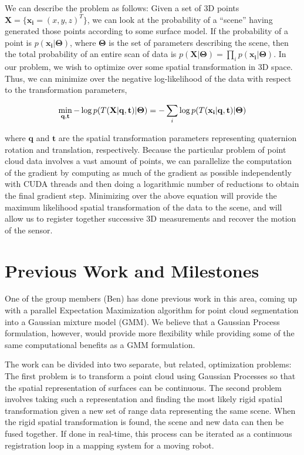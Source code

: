 \documentclass{article} %
\begin{document}
We can describe the problem as follows: Given a set of 3D points $\mathbf{X} = \{\mathbf{x_i} = (x,y,z)^{T}\}$, we can look at the probability of a ``scene'' having generated those points according to some surface model. If the probability of a point is $p(\mathbf{x_i}|\mathbf{\Theta{}})$, where $\mathbf{\Theta{}}$ is the set of parameters describing the scene, then the total probability of an entire scan of data is $p(\mathbf{X}|\mathbf{\Theta{}}) = \prod_{i} p(\mathbf{x_i}|\mathbf{\Theta{}})$. In our problem, we wish to optimize over some spatial transformation in 3D space. Thus, we can minimize over the negative log-likelihood of the data with respect to the transformation parameters,

$$
\min_{\mathbf{q},\mathbf{t}} -\log p(T(\mathbf{X}|\mathbf{q},\mathbf{t})|\mathbf{\Theta{}}) = - \sum_i \log  p(T(\mathbf{x_i}|\mathbf{q},\mathbf{t}) | \mathbf{\Theta{}}) \\
$$

where $\mathbf{q}$ and $\mathbf{t}$ are the spatial transformation parameters representing quaternion rotation and translation, respectively. Because the particular problem of point cloud data involves a vast amount of points, we can parallelize the computation of the gradient by computing as much of the gradient as possible independently with CUDA threads and then doing a logarithmic number of reductions to obtain the final gradient step. Minimizing over the above equation will provide the maximum likelihood spatial transformation of the data to the scene, and will allow us to register together successive 3D measurements and recover the motion of the sensor.

\section{Previous Work and Milestones}

One of the group members (Ben) has done previous work in this area, coming up with a parallel Expectation Maximization algorithm for point cloud segmentation into a Gaussian mixture model (GMM). We believe that a Gaussian Process formulation, however, would provide more flexibility while providing some of the same computational benefits as a GMM formulation. 

The work can be divided into two separate, but related, optimization problems: The first problem is to transform a point cloud using Gaussian Processes so that the spatial representation of surfaces can be continuous. The second problem involves taking such a representation and finding the most likely rigid spatial transformation given a new set of range data representing the same scene. When the rigid spatial transformation is found, the scene and new data can then be fused together. If done in real-time, this process can be iterated as a continuous registration loop in a mapping system for a moving robot.
\end{document}
